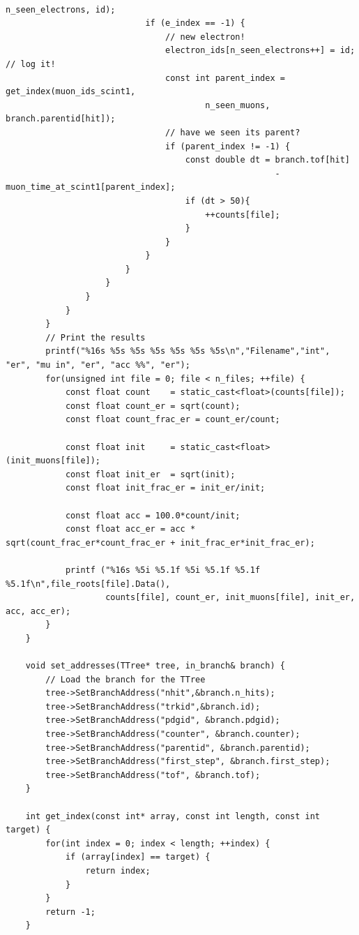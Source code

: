 \documentclass[]{article}
\begin{document}
\begin{verbatim}
                                                          n_seen_electrons, id);
                            if (e_index == -1) {
                                // new electron!
                                electron_ids[n_seen_electrons++] = id; // log it!
                                const int parent_index = get_index(muon_ids_scint1,
                                        n_seen_muons, branch.parentid[hit]);
                                // have we seen its parent?
                                if (parent_index != -1) {
                                    const double dt = branch.tof[hit] 
                                                      - muon_time_at_scint1[parent_index];
                                    if (dt > 50){
                                        ++counts[file];
                                    }
                                }
                            }
                        }
                    }
                }
            }
        }
        // Print the results
        printf("%16s %5s %5s %5s %5s %5s %5s\n","Filename","int", "er", "mu in", "er", "acc %%", "er");
        for(unsigned int file = 0; file < n_files; ++file) {
            const float count    = static_cast<float>(counts[file]);
            const float count_er = sqrt(count);
            const float count_frac_er = count_er/count;

            const float init     = static_cast<float>(init_muons[file]);
            const float init_er  = sqrt(init);
            const float init_frac_er = init_er/init;

            const float acc = 100.0*count/init;
            const float acc_er = acc * sqrt(count_frac_er*count_frac_er + init_frac_er*init_frac_er);

            printf ("%16s %5i %5.1f %5i %5.1f %5.1f %5.1f\n",file_roots[file].Data(), 
                    counts[file], count_er, init_muons[file], init_er, acc, acc_er);
        }
    }

    void set_addresses(TTree* tree, in_branch& branch) {
        // Load the branch for the TTree
        tree->SetBranchAddress("nhit",&branch.n_hits);
        tree->SetBranchAddress("trkid",&branch.id);
        tree->SetBranchAddress("pdgid", &branch.pdgid);
        tree->SetBranchAddress("counter", &branch.counter);
        tree->SetBranchAddress("parentid", &branch.parentid);
        tree->SetBranchAddress("first_step", &branch.first_step);
        tree->SetBranchAddress("tof", &branch.tof);
    }

    int get_index(const int* array, const int length, const int target) {
        for(int index = 0; index < length; ++index) {
            if (array[index] == target) {
                return index;
            }
        }
        return -1;
    }
\end{verbatim}



\end{document}

